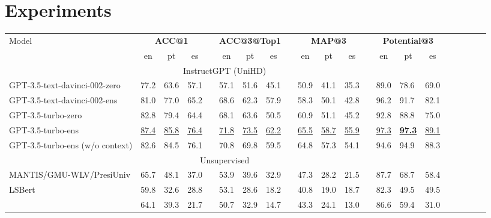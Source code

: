 \documentclass[11pt]{article}
\begin{document}
\section{Experiments}
\begin{table*}[t!]
\begin{center}
\begin{adjustbox}{max width=\textwidth}
\begin{tabular}{lllllllllllllllllllll}
\toprule
\multirow{2}{*}{Model}
&\multicolumn{3}{c}{\textbf{ACC@1}}
&&\multicolumn{3}{c}{\textbf{ACC@3@Top1}}
&&\multicolumn{3}{c}{\textbf{MAP@3}}
&&\multicolumn{3}{c}{{\textbf{Potential@3}}}\\
  \cmidrule{2-4}
  \cmidrule{6-8}
  \cmidrule{10-12}
  \cmidrule{14-16}

&\multicolumn{1}{c}{en}&\multicolumn{1}{c}{pt}&\multicolumn{1}{c}{es}
&&\multicolumn{1}{c}{en}&\multicolumn{1}{c}{pt}&\multicolumn{1}{c}{es}
&&\multicolumn{1}{c}{en}&\multicolumn{1}{c}{pt}&\multicolumn{1}{c}{es}
&&\multicolumn{1}{c}{en}&\multicolumn{1}{c}{pt}&\multicolumn{1}{c}{es}\\\midrule

\multicolumn{16}{c}{{InstructGPT (UniHD)}}\\
  \midrule
  GPT-3.5-text-davinci-002-zero
&77.2&63.6&57.1&&57.1&51.6&45.1&&50.9&41.1&35.3&&89.0&78.6&69.0\\

GPT-3.5-text-davinci-002-ens
&81.0&77.0&65.2&&68.6&62.3&57.9&&58.3&50.1&42.8&&96.2&91.7&82.1\\
GPT-3.5-turbo-zero
&82.8&79.4&64.4&&68.1&63.6&50.5&&60.9&51.1&45.2&&92.8&88.8&75.0\\
GPT-3.5-turbo-ens
&\underline{87.4}&\underline{85.8}&\underline{76.4}&&\underline{71.8}&\underline{73.5}&\underline{62.2}&&\underline{65.5}&\underline{58.7}&\underline{55.9}&&\underline{97.3}&\textbf{\underline{97.3}}&\underline{89.1}
\\

GPT-3.5-turbo-ens (w/o context)
&82.6&84.5&76.1&&70.8&69.8&59.5&&64.8&57.3&54.1&&94.6&94.9&88.3\\

\midrule
\multicolumn{16}{c}{{Unsupervised}}\\\midrule
MANTIS/GMU-WLV/PresiUniv 
&65.7&48.1&37.0&&53.9&39.6&32.9&&47.3&28.2&21.5&&87.7&68.7&58.4\\
LSBert 
&59.8&32.6&28.8&&53.1&28.6&18.2&&40.8&19.0&18.7&&82.3&49.5&49.5\\
\citet{wada-etal-2022-unsupervised} 
&64.1&39.3&21.7&&50.7&32.9&14.7&&43.3&24.1&13.0&&86.6&59.4&31.0
\\


\end{tabular}
\end{adjustbox}
\end{center}
\end{table*}
\end{document}
